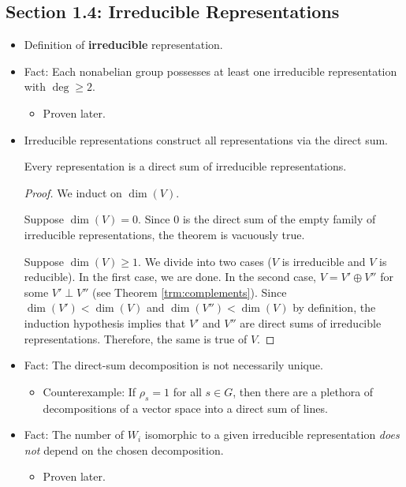 \documentclass[../notes.tex]{subfiles}
\begin{document}
\subsection*{Section 1.4: Irreducible Representations}
\begin{itemize}
    \item Definition of \textbf{irreducible} representation.
    \item Fact: Each nonabelian group possesses at least one irreducible representation with $\deg\geq 2$.
    \begin{itemize}
        \item Proven later.
    \end{itemize}
    \item Irreducible representations construct all representations via the direct sum.
    \begin{theorem}
        Every representation is a direct sum of irreducible representations.
        \begin{proof}
            We induct on $\dim(V)$.\par
            Suppose $\dim(V)=0$. Since 0 is the direct sum of the empty family of irreducible representations, the theorem is vacuously true.\par
            Suppose $\dim(V)\geq 1$. We divide into two cases ($V$ is irreducible and $V$ is reducible). In the first case, we are done. In the second case, $V=V'\oplus V''$ for some $V'\perp V''$ (see Theorem \ref{trm:complements}). Since $\dim(V')<\dim(V)$ and $\dim(V'')<\dim(V)$ by definition, the induction hypothesis implies that $V'$ and $V''$ are direct sums of irreducible representations. Therefore, the same is true of $V$.
        \end{proof}
    \end{theorem}
    \item Fact: The direct-sum decomposition is not necessarily unique.
    \begin{itemize}
        \item Counterexample: If $\rho_s=1$ for all $s\in G$, then there are a plethora of decompositions of a vector space into a direct sum of lines.
    \end{itemize}
    \item Fact: The number of $W_i$ isomorphic to a given irreducible representation \emph{does not} depend on the chosen decomposition.
    \begin{itemize}
        \item Proven later.
    \end{itemize}
\end{itemize}
\end{document}
